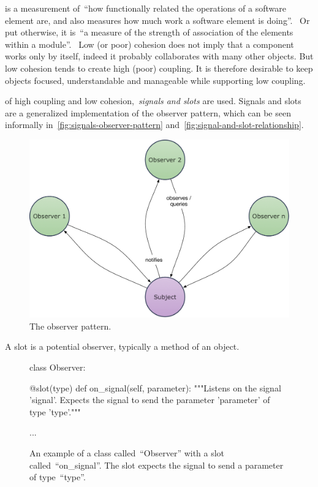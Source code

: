 \documentclass[%
    a4paper,    %
    justified,  %
    nobib,      %
    openany     %
]{tufte-book}
\makeatletter
\renewcommand{\label}[1]{\@tufte@label{##1}}%
\makeatother
\begin{document}
 is a measurement of~\enquote{how functionally related the
operations of a software element are, and also measures how much work a software
element is doing}.~\cite{larman-applying-2004} Or put otherwise, it
is~\enquote{a measure of the strength of association of the elements within a
module}.~\cite[p. 52]{ieee-swebok-2014} Low (or poor) cohesion does not imply
that a component works only by itself, indeed it probably collaborates with many
other objects. But low cohesion tends to create high (poor) coupling. It is
therefore desirable to keep objects focused, understandable and manageable while
supporting low coupling.~\cite{larman-applying-2004}

 of high coupling and low
cohesion,~\emph{signals and slots} are used. Signals and slots are a generalized
implementation of the observer pattern, which can be seen informally
in~\cref{fig:signals-observer-pattern}
and~\cref{fig:signal-and-slot-relationship}.

\begin{figure}[ht]
  \includegraphics[width=0.8\linewidth]{images/observer-pattern}
  \caption{The observer pattern.~\cite{gamma-dpe-1995}}
  \label{fig:signals-observer-pattern}
\end{figure}

 A slot is a potential observer,
typically a method of an object.

\begin{figure}
  \begin{pythoncode}
class Observer:

    @slot(type)
    def on_signal(self, parameter):
        """Listens on the signal 'signal'. Expects the
        signal to send the parameter 'parameter' of
        type 'type'."""

        ...
  \end{pythoncode}
  \label{lst:signal-slot:observer-slot}
  \caption{An example of a class called~\enquote{Observer} with a slot
    called~\enquote{on\_signal}. The slot expects the signal to send a parameter
    of type~\enquote{type}.
  }
\end{figure}
\end{document}
